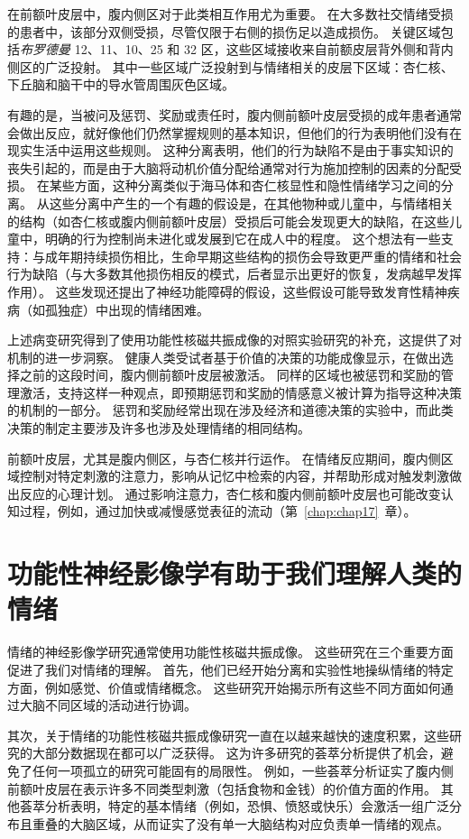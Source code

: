 在前额叶皮层中，腹内侧区对于此类相互作用尤为重要。 在大多数社交情绪受损的患者中，该部分双侧受损，尽管仅限于右侧的损伤足以造成损伤。
关键区域包括\textit{布罗德曼} 12、11、10、25 和 32 区，这些区域接收来自前额皮层背外侧和背内侧区的广泛投射。
其中一些区域广泛投射到与情绪相关的皮层下区域：杏仁核、下丘脑和脑干中的导水管周围灰色区域。


有趣的是，当被问及惩罚、奖励或责任时，腹内侧前额叶皮层受损的成年患者通常会做出反应，就好像他们仍然掌握规则的基本知识，但他们的行为表明他们没有在现实生活中运用这些规则。
这种分离表明，他们的行为缺陷不是由于事实知识的丧失引起的，而是由于大脑将动机价值分配给通常对行为施加控制的因素的分配受损。
在某些方面，这种分离类似于海马体和杏仁核显性和隐性情绪学习之间的分离。
从这些分离中产生的一个有趣的假设是，在其他物种或儿童中，与情绪相关的结构（如杏仁核或腹内侧前额叶皮层）受损后可能会发现更大的缺陷，在这些儿童中，明确的行为控制尚未进化或发展到它在成人中的程度。
这个想法有一些支持：与成年期持续损伤相比，生命早期这些结构的损伤会导致更严重的情绪和社会行为缺陷（与大多数其他损伤相反的模式，后者显示出更好的恢复，发病越早发挥作用）。
这些发现还提出了神经功能障碍的假设，这些假设可能导致发育性精神疾病（如孤独症）中出现的情绪困难。


上述病变研究得到了使用功能性核磁共振成像的对照实验研究的补充，这提供了对机制的进一步洞察。
健康人类受试者基于价值的决策的功能成像显示，在做出选择之前的这段时间，腹内侧前额叶皮层被激活。
同样的区域也被惩罚和奖励的管理激活，支持这样一种观点，即预期惩罚和奖励的情感意义被计算为指导这种决策的机制的一部分。
惩罚和奖励经常出现在涉及经济和道德决策的实验中，而此类决策的制定主要涉及许多也涉及处理情绪的相同结构。


前额叶皮层，尤其是腹内侧区，与杏仁核并行运作。
在情绪反应期间，腹内侧区域控制对特定刺激的注意力，影响从记忆中检索的内容，并帮助形成对触发刺激做出反应的心理计划。
通过影响注意力，杏仁核和腹内侧前额叶皮层也可能改变认知过程，例如，通过加快或减慢感觉表征的流动（第~\ref{chap:chap17}~章）。


\section{功能性神经影像学有助于我们理解人类的情绪}

情绪的神经影像学研究通常使用功能性核磁共振成像。
这些研究在三个重要方面促进了我们对情绪的理解。
首先，他们已经开始分离和实验性地操纵情绪的特定方面，例如感觉、价值或情绪概念。
这些研究开始揭示所有这些不同方面如何通过大脑不同区域的活动进行协调。


其次，关于情绪的功能性核磁共振成像研究一直在以越来越快的速度积累，这些研究的大部分数据现在都可以广泛获得。
这为许多研究的荟萃分析提供了机会，避免了任何一项孤立的研究可能固有的局限性。
例如，一些荟萃分析证实了腹内侧前额叶皮层在表示许多不同类型刺激（包括食物和金钱）的价值方面的作用。
其他荟萃分析表明，特定的基本情绪（例如，恐惧、愤怒或快乐）会激活一组广泛分布且重叠的大脑区域，从而证实了没有单一大脑结构对应负责单一情绪的观点。


